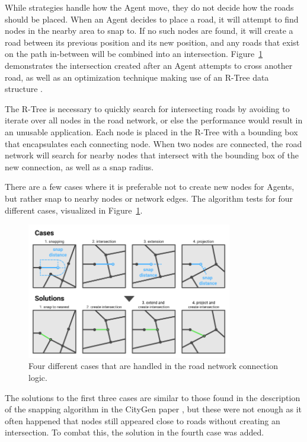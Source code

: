 
While strategies handle how the Agent move, they do not decide how the roads should be placed.
When an Agent decides to place a road, it will attempt to find nodes in the nearby area to snap to.
If no such nodes are found, it will create a road between its previous position and its new position, and any roads that exist on the path in-between will be combined into an intersection.
Figure~\ref{fig:road_connection_cases} demonstrates the intersection created after an Agent attempts to cross another road, as well as an optimization technique making use of an R-Tree data structure \cite{wiki:R-tree}.

The R-Tree is necessary to quickly search for intersecting roads by avoiding to iterate over all nodes in the road network, or else the performance would result in an unusable application.
Each node is placed in the R-Tree with a bounding box that encapsulates each connecting node.
When two nodes are connected, the road network will search for nearby nodes that intersect with the bounding box of the new connection, as well as a snap radius.

There are a few cases where it is preferable not to create new nodes for Agents, but rather snap to nearby nodes or network edges.
The algorithm tests for four different cases, visualized in Figure~\ref{fig:road_connection_cases}.

\begin{figure}[H]
  \centering

  \includegraphics[width=0.8\textwidth]{figure/road_connection_cases.png}
  \caption{Four different cases that are handled in the road network connection logic.}

  \label{fig:road_connection_cases}
\end{figure}

The solutions to the first three cases are similar to those found in the description of the snapping algorithm in the CityGen paper \cite[p. 6]{citygen_paper}, but these were not enough as it often happened that nodes still appeared close to roads without creating an intersection.
To combat this, the solution in the fourth case was added.

